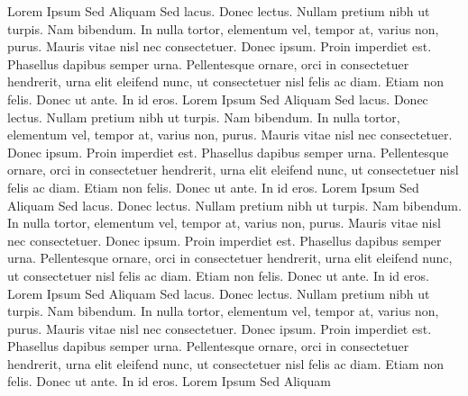 Lorem Ipsum Sed Aliquam
Sed lacus. Donec lectus. Nullam pretium nibh ut turpis. Nam bibendum. In nulla tortor, elementum vel, tempor at, varius non, purus. Mauris vitae nisl nec consectetuer. Donec ipsum. Proin imperdiet est. Phasellus dapibus semper urna. Pellentesque ornare, orci in consectetuer hendrerit, urna elit eleifend nunc, ut consectetuer nisl felis ac diam. Etiam non felis. Donec ut ante. In id eros.
Lorem Ipsum Sed Aliquam
Sed lacus. Donec lectus. Nullam pretium nibh ut turpis. Nam bibendum. In nulla tortor, elementum vel, tempor at, varius non, purus. Mauris vitae nisl nec consectetuer. Donec ipsum. Proin imperdiet est. Phasellus dapibus semper urna. Pellentesque ornare, orci in consectetuer hendrerit, urna elit eleifend nunc, ut consectetuer nisl felis ac diam. Etiam non felis. Donec ut ante. In id eros.
Lorem Ipsum Sed Aliquam
Sed lacus. Donec lectus. Nullam pretium nibh ut turpis. Nam bibendum. In nulla tortor, elementum vel, tempor at, varius non, purus. Mauris vitae nisl nec consectetuer. Donec ipsum. Proin imperdiet est. Phasellus dapibus semper urna. Pellentesque ornare, orci in consectetuer hendrerit, urna elit eleifend nunc, ut consectetuer nisl felis ac diam. Etiam non felis. Donec ut ante. In id eros.
Lorem Ipsum Sed Aliquam
Sed lacus. Donec lectus. Nullam pretium nibh ut turpis. Nam bibendum. In nulla tortor, elementum vel, tempor at, varius non, purus. Mauris vitae nisl nec consectetuer. Donec ipsum. Proin imperdiet est. Phasellus dapibus semper urna. Pellentesque ornare, orci in consectetuer hendrerit, urna elit eleifend nunc, ut consectetuer nisl felis ac diam. Etiam non felis. Donec ut ante. In id eros.
Lorem Ipsum Sed Aliquam

